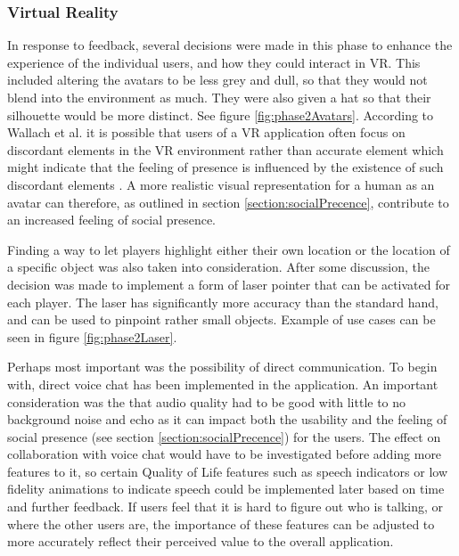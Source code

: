\subsubsection{Virtual Reality}
In response to feedback, several decisions were made in this phase to enhance the experience of the individual users, and how they could interact in VR. This included altering the avatars to be less grey and dull, so that they would not blend into the environment as much. They were also given a hat so that their silhouette would be more distinct.  See figure \ref{fig:phase2Avatars}.
According  to  Wallach  et  al. it is possible that users of a VR application often focus on discordant elements in the VR environment rather than accurate element which might indicate that the feeling of presence is influenced by the existence of such discordant elements \cite{presenceInVirtualReality:}. A more realistic visual representation for a human as an avatar can therefore, as outlined in section \ref{section:socialPrecence}, contribute to an increased feeling of social presence. 

Finding a way to let players highlight either their own location or the location of a specific object was also taken into consideration. After some discussion, the decision was made to implement a form of laser pointer that can be activated for each player. The laser has significantly more accuracy than the standard hand, and can be used to pinpoint rather small objects. Example of use cases can be seen in figure \ref{fig:phase2Laser}.

Perhaps most important was the possibility of direct communication. To begin with, direct voice chat has been implemented in the application. An important consideration was the that audio quality had to be good with little to no background noise and echo as it can impact both the usability and the feeling of social presence (see section \ref{section:socialPrecence}) for the users. 
The effect on collaboration with voice chat would have to be investigated before adding more features to it, so certain Quality of Life features such as speech indicators or low fidelity animations to indicate speech could be implemented later based on time and further feedback. If users feel that it is hard to figure out who is talking, or where the other users are, the importance of these features can be adjusted to more accurately reflect their perceived value to the overall application.




